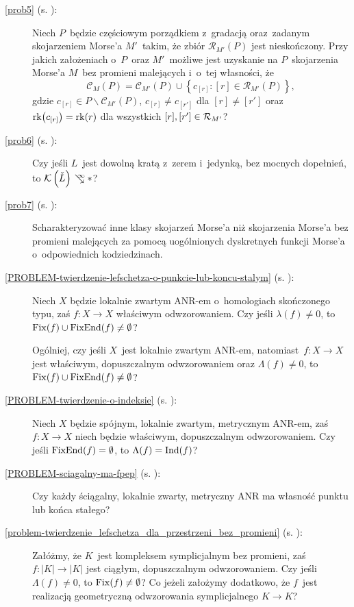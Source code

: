 \begin{description}
\item[\ref{prob5} \normalfont (s. \pageref{prob5}):] Niech $P$~będzie częściowym porządkiem z~gradacją oraz~zadanym skojarzeniem Morse'a $M'$~takim, że zbiór $\mathcal{R}_{M'}(P)$ jest nieskończony. 
Przy jakich założeniach o~$P$~oraz $M'$~możliwe jest uzyskanie na $P$~skojarzenia Morse'a $M$~bez promieni malejących i~o~tej własności, że \[\mathcal{C}_{M}(P)=\mathcal{C}_{M'}(P)\cup \left\{c_{[r]}:[r]\in\mathcal{R}_{M'}(P)\right\},\] gdzie $c_{[r]}\in P\smallsetminus \mathcal{C}_{M'}(P)$, $c_{[r]}\not=c_{[r']}$ dla $[r]\not=[r']$ oraz $\operatorname{rk}\bigl(c_{[r]}\bigr)=\operatorname{rk}(r)$ dla wszystkich $[r],[r']\in\mathcal{R}_{M'}$? 

\item[\ref{prob6} \normalfont (s. \pageref{prob6}):] Czy jeśli $L$~jest dowolną kratą z~zerem i~jedynką, bez mocnych dopełnień, to $\mK\left(\check{L}\right)\infcoll *$?

\item[\ref{prob7} \normalfont (s. \pageref{prob7}):] Scharakteryzować inne klasy skojarzeń Morse'a niż skojarzenia Morse'a bez promieni malejących za pomocą uogólnionych dyskretnych funkcji Morse'a o~odpowiednich kodziedzinach.

\item[\ref{PROBLEM-twierdzenie-lefschetza-o-punkcie-lub-koncu-stalym} \normalfont (s. \pageref{PROBLEM-twierdzenie-lefschetza-o-punkcie-lub-koncu-stalym}):] Niech $X$ będzie lokalnie zwartym ANR-em o~homologiach skończonego typu, zaś $f\colon X\to X$ właściwym odwzorowaniem. Czy jeśli \mbox{$\lambda(f)\not=0$}, to $\operatorname{Fix}(f)\cup\operatorname{FixEnd}(f)\not=\emptyset$?

Ogólniej, czy jeśli $X$~jest lokalnie zwartym ANR-em, natomiast~\mbox{$f\colon X\to X$} jest właściwym, dopuszczalnym odwzorowaniem oraz $\Lambda(f)\not=0$, to $\operatorname{Fix}(f)\cup\operatorname{FixEnd}(f)\not=\emptyset$?

\item[\ref{PROBLEM-twierdzenie-o-indeksie} \normalfont (s. \pageref{PROBLEM-twierdzenie-o-indeksie}):] Niech $X$ będzie spójnym, lokalnie zwartym, metrycznym \mbox{ANR-em}, zaś $f\colon X\to X$ niech będzie właściwym, dopuszczalnym odwzorowaniem. Czy jeśli $\operatorname{FixEnd}(f)=\emptyset$, to $\Lambda(f)=\operatorname{Ind}(f)$?

\item[\ref{PROBLEM-sciagalny-ma-fpep} \normalfont (s. \pageref{PROBLEM-sciagalny-ma-fpep}):] Czy każdy ściągalny, lokalnie zwarty, metryczny ANR ma własność punktu lub końca stałego?

\item[\ref{problem-twierdzenie_lefschetza_dla_przestrzeni_bez_promieni} \normalfont (s. \pageref{problem-twierdzenie_lefschetza_dla_przestrzeni_bez_promieni}):] Załóżmy, że $K$~jest kompleksem symplicjalnym bez promieni, zaś~$f\colon |K|\to |K|$ jest ciągłym, dopuszczalnym odwzorowaniem. Czy jeśli $\Lambda(f)\not=0$, to $\operatorname{Fix}(f)\not=\emptyset$? Co jeżeli założymy dodatkowo, że $f$~jest realizacją geometryczną odwzorowania symplicjalnego $K\to K$?


\end{description}
